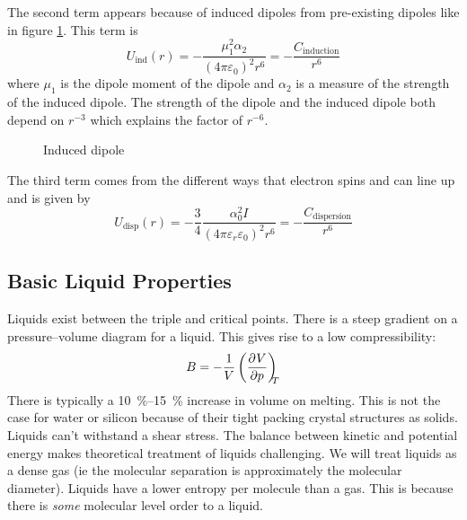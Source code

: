 \documentclass{article}
\begin{document}
    The second term appears because of induced dipoles from pre-existing dipoles like in figure \ref{fig:induced dipole}.
    This term is
    \[U_\text{ind}(r) = -\frac{\mu_1^2\alpha_2}{(4\pi\varepsilon_0)^2r^6} = - \frac{C_\text{induction}}{r^6}\]
    where \(\mu_1\) is the dipole moment of the dipole and \(\alpha_2\) is a measure of the strength of the induced dipole.
    The strength of the dipole and the induced dipole both depend on \(r^{-3}\) which explains the factor of \(r^{-6}\).
    \begin{figure}[ht]
        \centering
        \caption{Induced dipole}
        \label{fig:induced dipole}
    \end{figure}
    The third term comes from the different ways that electron spins and can line up and is given by
    \[U_\text{disp}(r) = -\frac{3}{4}\frac{\alpha_0^2I}{(4\pi\varepsilon_r\varepsilon_0)^2r^6} = -\frac{C_\text{dispersion}}{r^6}\]
    
    \subsection{Basic Liquid Properties}
    Liquids exist between the triple and critical points.
    There is a steep gradient on a pressure--volume diagram for a liquid.
    This gives rise to a low compressibility:
    \[B = -\frac{1}{V}\left(\pdv[]{V}{p}\right)_{\!\!\!{T}}\]
    There is typically a \SIrange{10}{15}{\%} increase in volume on melting.
    This is not the case for water or silicon because of their tight packing crystal structures as solids.
    Liquids can't withstand a shear stress.
    The balance between kinetic and potential energy makes theoretical treatment of liquids challenging.
    We will treat liquids as a dense gas (ie the molecular separation is approximately the molecular diameter).
    Liquids have a lower entropy per molecule than a gas.
    This is because there is \emph{some} molecular level order to a liquid.
    
\end{document}
